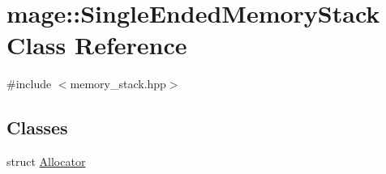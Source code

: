 \hypertarget{classmage_1_1_single_ended_memory_stack}{}\section{mage\+:\+:Single\+Ended\+Memory\+Stack Class Reference}
\label{classmage_1_1_single_ended_memory_stack}


{\ttfamily \#include $<$memory\+\_\+stack.\+hpp$>$}

\subsection*{Classes}
\begin{DoxyCompactItemize}
\item 
struct \hyperlink{structmage_1_1_single_ended_memory_stack_1_1_allocator}{Allocator}
\end{DoxyCompactItemize}
